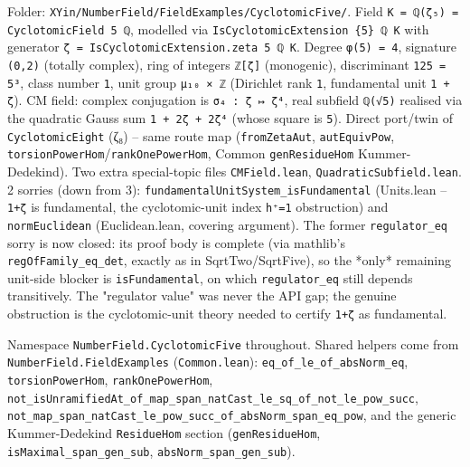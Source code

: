 \documentclass[UTF8,a4paper,11pt,fontset=fandol]{ctexart}
\theoremstyle{definition}
\begin{document}
Folder: \texttt{XYin/\allowbreak{}NumberField/\allowbreak{}FieldExamples/\allowbreak{}CyclotomicFive/\allowbreak{}}. Field \texttt{K = ℚ(ζ₅) = CyclotomicField 5 ℚ}, modelled via \texttt{IsCyclotomicExtension \{5\} ℚ K} with generator \texttt{ζ = IsCyclotomicExtension.\allowbreak{}zeta 5 ℚ K}. Degree \texttt{φ(5) = 4}, signature \texttt{(0,2)} (totally complex), ring of integers \texttt{ℤ[ζ]} (monogenic), discriminant \texttt{125 = 5³}, class number \texttt{1}, unit group \texttt{μ₁₀ × ℤ} (Dirichlet rank \texttt{1}, fundamental unit \texttt{1 + ζ}). CM field: complex conjugation is \texttt{σ₄ : ζ ↦ ζ⁴}, real subfield \texttt{ℚ(√5)} realised via the quadratic Gauss sum \texttt{1 + 2ζ + 2ζ⁴} (whose square is \texttt{5}). Direct port/twin of \texttt{CyclotomicEight} (ζ₈) -- same route map (\texttt{fromZetaAut}, \texttt{autEquivPow}, \texttt{torsionPowerHom}/\texttt{rankOnePowerHom}, Common \texttt{genResidueHom} Kummer-Dedekind). Two extra special-topic files \texttt{CMField.\allowbreak{}lean}, \texttt{QuadraticSubfield.\allowbreak{}lean}. 2 sorries (down from 3): \texttt{fundamentalUnitSystem\_\allowbreak{}isFundamental} (Units.lean -- \texttt{1+ζ} is fundamental, the cyclotomic-unit index \texttt{h⁺=1} obstruction) and \texttt{normEuclidean} (Euclidean.lean, covering argument). The former \texttt{regulator\_\allowbreak{}eq} sorry is now closed: its proof body is complete (via mathlib's \texttt{regOfFamily\_\allowbreak{}eq\_\allowbreak{}det}, exactly as in SqrtTwo/SqrtFive), so the *only* remaining unit-side blocker is \texttt{isFundamental}, on which \texttt{regulator\_\allowbreak{}eq} still depends transitively. The "regulator value" was never the API gap; the genuine obstruction is the cyclotomic-unit theory needed to certify \texttt{1+ζ} as fundamental.

Namespace \texttt{NumberField.\allowbreak{}CyclotomicFive} throughout. Shared helpers come from \texttt{NumberField.\allowbreak{}FieldExamples} (\texttt{Common.\allowbreak{}lean}): \texttt{eq\_\allowbreak{}of\_\allowbreak{}le\_\allowbreak{}of\_\allowbreak{}absNorm\_\allowbreak{}eq}, \texttt{torsionPowerHom}, \texttt{rankOnePowerHom}, \texttt{not\_\allowbreak{}isUnramifiedAt\_\allowbreak{}of\_\allowbreak{}map\_\allowbreak{}span\_\allowbreak{}natCast\_\allowbreak{}le\_\allowbreak{}sq\_\allowbreak{}of\_\allowbreak{}not\_\allowbreak{}le\_\allowbreak{}pow\_\allowbreak{}succ}, \texttt{not\_\allowbreak{}map\_\allowbreak{}span\_\allowbreak{}natCast\_\allowbreak{}le\_\allowbreak{}pow\_\allowbreak{}succ\_\allowbreak{}of\_\allowbreak{}absNorm\_\allowbreak{}span\_\allowbreak{}eq\_\allowbreak{}pow}, and the generic Kummer-Dedekind \texttt{ResidueHom} section (\texttt{genResidueHom}, \texttt{isMaximal\_\allowbreak{}span\_\allowbreak{}gen\_\allowbreak{}sub}, \texttt{absNorm\_\allowbreak{}span\_\allowbreak{}gen\_\allowbreak{}sub}).
\end{document}
